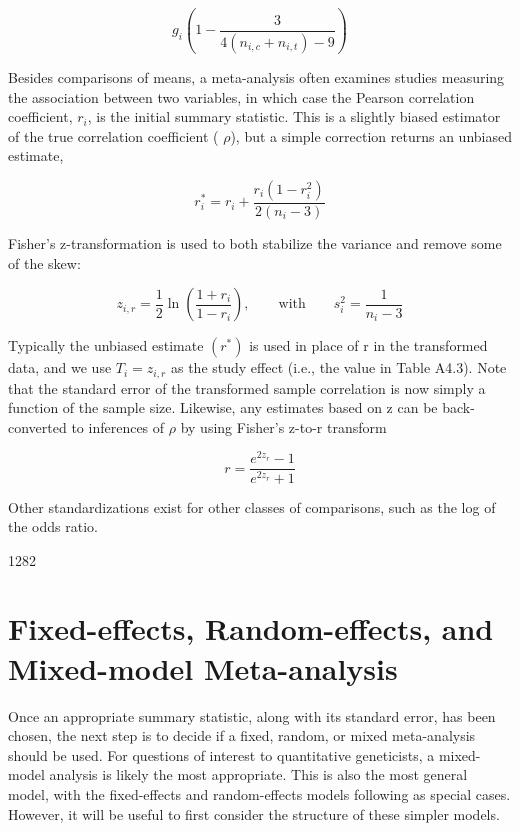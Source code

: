 \documentclass{article}
\begin{document}
\begin{equation}
g_{i}\left(1-\frac{3}{4(n_{i,c}+n_{i,t})-9}\right)
\end{equation}

Besides comparisons of means, a meta-analysis often examines studies measuring the association between two variables, in which case the Pearson correlation coefficient,  $ r_{i} $, is the initial summary statistic. This is a slightly biased estimator of the true correlation coefficient ( $ \rho $), but a simple correction returns an unbiased estimate,

\begin{equation}
r_{i}^{*}=r_{i}+\frac{r_{i}(1-r_{i}^{2})}{2(n_{i}-3)}
\end{equation}

Fisher's z-transformation is used to both stabilize the variance and remove some of the skew:

\begin{equation}
z_{i,r}=\frac{1}{2}\ln\left(\frac{1+r_{i}}{1-r_{i}}\right),\qquad\mathrm{w i t h}\qquad s_{i}^{2}=\frac{1}{n_{i}-3}
\end{equation}

Typically the unbiased estimate  $ (r^{*}) $ is used in place of r in the transformed data, and we use  $ T_{i} = z_{i,r} $ as the study effect (i.e., the value in Table A4.3). Note that the standard error of the transformed sample correlation is now simply a function of the sample size. Likewise, any estimates based on z can be back-converted to inferences of  $ \rho $ by using Fisher's z-to-r transform

\begin{equation}
r=\frac{e^{2z_{r}}-1}{e^{2z_{r}}+1}
\end{equation}

Other standardizations exist for other classes of comparisons, such as the log of the odds ratio.

1282

\section{Fixed-effects, Random-effects, and Mixed-model Meta-analysis}
Once an appropriate summary statistic, along with its standard error, has been chosen, the next step is to decide if a fixed, random, or mixed meta-analysis should be used. For questions of interest to quantitative geneticists, a mixed-model analysis is likely the most appropriate. This is also the most general model, with the fixed-effects and random-effects models following as special cases. However, it will be useful to first consider the structure of these simpler models.
\end{document}
